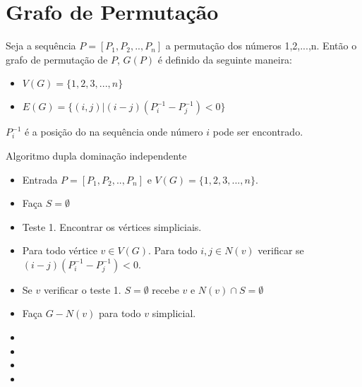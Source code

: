 \documentclass[a4paper,8pt]{article}
\theoremstyle{plain}
\begin{document}
\section{Grafo de Permutação}

Seja a sequência $P=[P_1,P_2,..,P_n]$ a permutação dos números 1,2,...,n. Então o grafo de permutação de $P$, $G(P)$ é definido da seguinte maneira:

\begin{itemize}
    \item $V(G)=\{1,2,3,...,n\}$
    \item $E(G)=\{(i,j)|(i-j)(P^{-1}_i-P^{-1}_j)<0\}$
\end{itemize}
$P^{-1}_i$ é a posição do na sequência onde número $i$ pode ser encontrado. 

Algoritmo dupla dominação independente

\begin{itemize}
    \item Entrada $P=[P_1,P_2,..,P_n]$ e $V(G)=\{1,2,3,...,n\}$.
    \item Faça $S=\emptyset$
    \item Teste 1. Encontrar os vértices simpliciais.
    \item Para todo vértice $v\in V(G)$. Para todo $i,j \in N(v)$ verificar se $(i-j)(P^{-1}_i-P^{-1}_j)<0$.
    \item Se $v$ verificar o teste 1.  $S=\emptyset$ recebe $v$ e $N(v)\cap S=\emptyset$
    \item Faça $G-N(v)$ para todo $v$ simplicial.
    \item 
    \item
    \item
    
    
    
    
    
    
    
    
    
    
    
    
    
    
    
    
    \item
\end{itemize}
\end{document}
